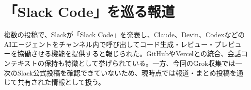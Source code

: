 \section{「Slack Code」を巡る報道}
複数の投稿で、Slackが「Slack Code」を発表し、Claude、Devin、CodexなどのAIエージェントをチャンネル内で呼び出してコード生成・レビュー・プレビューを協働させる機能を提供すると報じられた。GitHubやVercelとの統合、会話コンテキストの保持も特徴として挙げられている。一方、今回のGrok収集では一次のSlack公式投稿を確認できていないため、現時点では報道・まとめ投稿を通じて共有された情報として扱う。
